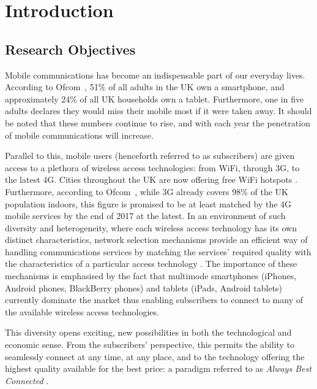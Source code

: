 \chapter{Introduction} %
\label{cha:introduction}

\section{Research Objectives} %
\label{sec:research_objectives_introduction}
Mobile communications has become an indispensable part of our everyday lives. According to Ofcom~\cite{OfcomReport2013}, 51\% of all adults in the UK own a smartphone, and approximately 24\% of all UK households own a tablet. Furthermore, one in five adults declares they would miss their mobile most if it were taken away. It should be noted that these numbers continue to rise, and with each year the penetration of mobile communications will increase.

Parallel to this, mobile users (henceforth referred to as subscribers) are given access to a plethora of wireless access technologies: from WiFi, through 3G, to the latest 4G. Cities throughout the UK are now offering free WiFi hotspots \cite{BBCWiFiGlasgow2014}. Furthermore, according to Ofcom~\cite{OfcomLTE2013}, while 3G already covers 98\% of the UK population indoors, this figure is promised to be at least matched by the 4G mobile services by the end of 2017 at the latest. In an environment of such diversity and heterogeneity, where each wireless access technology has its own distinct characteristics, network selection mechanisms provide an efficient way of handling communications services by matching the services' required quality with the characteristics of a particular access technology \cite{HossainBeaubrun09}. The importance of these mechanisms is emphasised by the fact that multimode smartphones (iPhones, Android phones, BlackBerry phones) and tablets (iPads, Android tablets) currently dominate the market thus enabling subscribers to connect to many of the available wireless access technologies.

This diversity opens exciting, new possibilities in both the technological and economic sense.  From the subscribers' perspective, this permits the ability to seamlessly connect at any time, at any place, and to the technology offering the highest quality available for the best price: a paradigm referred to as \emph{Always Best Connected} \cite{ABC03}. 

